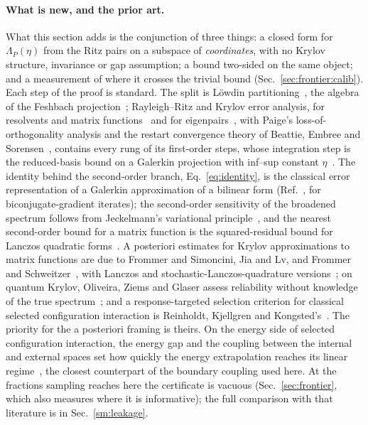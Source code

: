 \paragraph{What is new, and the prior art.} What this section adds is the conjunction of three things: a closed form
for $\Lambda_P(\eta)$ from the Ritz pairs on a subspace of \emph{coordinates}, with no Krylov structure,
invariance or gap assumption; a bound two-sided on the same object; and a measurement of where
it crosses the trivial bound (Sec.~\ref{sec:frontier:calib}). Each step of the proof is standard. The split is L\"owdin
partitioning~\cite{lowdin1962}, the algebra of the Feshbach projection~\cite{feshbach1958}; Rayleigh--Ritz
and Krylov error analysis, for resolvents and matrix functions~\cite{saad2011,golub2010} and for
eigenpairs~\cite{temple1928,weinstein1934,kato1949,epperly2022}, with Paige's loss-of-orthogonality
analysis and the restart convergence theory of Beattie, Embree and Sorensen~\cite{paige1976,beattie2005},
contains every rung of its first-order steps, whose integration step is the reduced-basis bound on a Galerkin
projection with inf--sup constant $\eta$~\cite{rozza2008,hesthaven2016}. The identity behind the second-order
branch, Eq.~\eqref{eq:identity}, is the classical error representation of a Galerkin approximation of a bilinear
form (Ref.~\cite{strakos2011}, for biconjugate-gradient iterates); the second-order sensitivity of the broadened
spectrum follows from Jeckelmann's variational principle~\cite{jeckelmann2002}, and the nearest second-order
bound for a matrix function is the squared-residual bound for Lanczos quadratic
forms~\cite{chen2022lanczos}. A posteriori estimates for Krylov
approximations to matrix functions are due to Frommer and Simoncini, Jia and Lv, and Frommer and
Schweitzer~\cite{frommersimoncini2008,jialv2015,frommerschweitzer2016}, with Lanczos and
stochastic-Lanczos-quadrature versions~\cite{chen2022lanczos,xuchen2025block,chen2021slq}; on quantum
Krylov, Oliveira, Ziems and Glaser assess reliability without knowledge of the true
spectrum~\cite{oliveira2026}; and a response-targeted selection criterion for classical selected
configuration interaction is Reinholdt, Kjellgren and Kongsted's~\cite{reinholdt2026lr}. The priority
for the a posteriori framing is theirs. On the energy side of selected configuration interaction, the
energy gap and the coupling between the internal and external spaces set how quickly the energy
extrapolation reaches its linear regime~\cite{burtonloos2024}, the closest counterpart of the boundary
coupling used here. At the fractions sampling reaches here the certificate is vacuous
(Sec.~\ref{sec:frontier}, which also measures where it is informative); the full comparison with that
literature is in Sec.~\ref{sm:leakage}.



